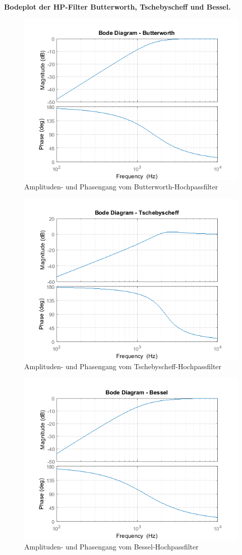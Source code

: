 \textbf{Bodeplot der HP-Filter Butterworth, Tschebyscheff und Bessel.}

\begin{figure}[h]
	\centering
	\includegraphics[width=0.9\linewidth]{Bilder/HP_Butterworth}
	\caption{Amplituden- und Phasengang vom Butterworth-Hochpassfilter}
	\label{fig:HP_Butterworth}
\end{figure}

\newpage

\begin{figure}[h]
	\centering
	\includegraphics[width=0.6\linewidth]{Bilder/HP_Tschebyscheff}
	\caption{Amplituden- und Phasengang vom Tschebyscheff-Hochpassfilter}
	\label{fig:HP_Tschebyscheff}
\end{figure}

\begin{figure}[h]
	\centering
	\includegraphics[width=0.6\linewidth]{Bilder/HP_Bessel}
	\caption{Amplituden- und Phasengang vom Bessel-Hochpassfilter}
	\label{fig:HP_Bessel}
\end{figure}


